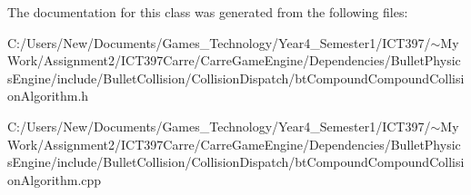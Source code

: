 The documentation for this class was generated from the following files:\begin{CompactItemize}
\item 
C:/Users/New/Documents/Games\_\-Technology/Year4\_\-Semester1/ICT397/$\sim$My Work/Assignment2/ICT397Carre/CarreGameEngine/Dependencies/BulletPhysicsEngine/include/BulletCollision/CollisionDispatch/btCompoundCompoundCollisionAlgorithm.h\item 
C:/Users/New/Documents/Games\_\-Technology/Year4\_\-Semester1/ICT397/$\sim$My Work/Assignment2/ICT397Carre/CarreGameEngine/Dependencies/BulletPhysicsEngine/include/BulletCollision/CollisionDispatch/btCompoundCompoundCollisionAlgorithm.cpp\end{CompactItemize}
